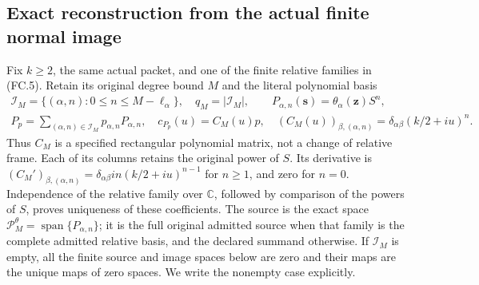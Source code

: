 \subsection{Exact reconstruction from the actual finite normal image}

Fix \(k\ge2\), the same actual packet, and one of the finite
relative families in (FC.5). Retain its original degree bound \(M\)
and the literal polynomial basis
\[
 \begin{gathered}
 \mathcal I_M=\{(\alpha,n):0\le n\le M-\ell_\alpha\},
 \quad q_M=|\mathcal I_M|,\qquad
 P_{\alpha,n}(\mathbf s)=\theta_\alpha(\mathbf z)S^n,\\
 P_p=\sum_{(\alpha,n)\in\mathcal I_M}p_{\alpha,n}P_{\alpha,n},
 \quad c_{P_p}(u)=C_M(u)p,
 \quad (C_M(u))_{\beta,(\alpha,n)}
       =\delta_{\alpha\beta}(k/2+iu)^n.
 \end{gathered}
 \tag{FC.28}
\]
Thus \(C_M\) is a specified rectangular polynomial matrix, not a
change of relative frame. Each of its columns retains the original
power of \(S\). Its derivative is
\((C_M')_{\beta,(\alpha,n)}=
\delta_{\alpha\beta}in(k/2+iu)^{n-1}\) for \(n\ge1\),
and zero for \(n=0\). Independence of the relative family over
\(\mathbb C\), followed by comparison of the powers of \(S\),
proves uniqueness of these coefficients. The source is the exact
space \(\mathcal P_M^\theta=\operatorname{span}\{P_{\alpha,n}\}\);
it is the full original admitted source when that family is the
complete admitted relative basis, and the declared summand otherwise.
If \(\mathcal I_M\) is empty, all the finite source and image
spaces below are zero and their maps are the unique maps of zero
spaces. We write the nonempty case explicitly.

